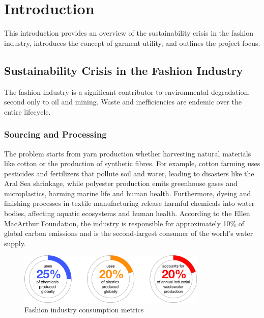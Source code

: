 \chapter{Introduction}

This introduction provides an overview of the sustainability crisis in the fashion industry, introduces the concept of garment utility, and outlines the project focus.

\section{Sustainability Crisis in the Fashion Industry}
The fashion industry is a significant contributor to environmental degradation, second only to oil and mining. Waste and inefficiencies are endemic over the entire lifecycle. 
\subsection{Sourcing and Processing}
The problem starts from yarn production whether harvesting natural materials like cotton or the production of synthetic fibres. For example, cotton farming uses pesticides and fertilizers that pollute soil and water, leading to disasters like the Aral Sea shrinkage, while polyester production emits greenhouse gases and microplastics, harming marine life and human health. Furthermore, dyeing and finishing processes in textile manufacturing release harmful chemicals into water bodies, affecting aquatic ecosystems and human health. According to the Ellen MacArthur Foundation, the industry is responsible for approximately 10\% of global carbon emissions and is the second-largest consumer of the world's water supply.
\begin{figure} [H]
    \centering
    \includegraphics[width=0.8\textwidth]{Images/sourcing donuts.png}
    \caption{Fashion industry consumption metrics}
\end{figure}
